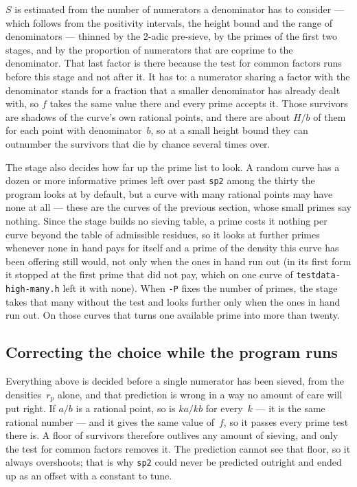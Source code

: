\documentclass[12pt,a4paper,oneside]{amsart}
\begin{document}
$S$ is estimated from the number of numerators a denominator has to consider
--- which follows from the positivity intervals, the height bound and the
range of denominators --- thinned by the 2-adic pre-sieve, by the
primes of the first two stages, and by the proportion of numerators that are
coprime to the denominator. That last factor is there because the test for
common factors runs before this stage and not after it. It has to: a
numerator sharing a factor with the denominator stands for a fraction that a
smaller denominator has already dealt with, so $f$ takes the same value there
and every prime accepts it. Those survivors are shadows of the curve's own
rational points, and there are about $H/b$ of them for each point with
denominator~$b$, so at a small height bound they can outnumber the survivors
that die by chance several times over.

The stage also decides how far up the prime list to look. A random curve has
a dozen or more informative primes left over past \texttt{sp2} among the
thirty the program looks at by default, but a curve with many rational points
may have none at all --- these are the curves of the previous section, whose
small primes say nothing. Since the stage builds no sieving table, a prime
costs it nothing per curve beyond the table of admissible residues, so it
looks at further primes whenever none in hand pays for itself and a prime
of the density this curve has been offering still would, not only when the
ones in hand run out (in its first form it stopped at the first prime that
did not pay, which on one curve of \texttt{testdata-high-many.h} left it
with none). When \verb+-P+ fixes the number of primes, the stage takes that
many without the test and looks further only when the ones in hand run out.
On those curves that turns one available prime into more than twenty.

\subsection{Correcting the choice while the program runs}\label{sec:adapt}

Everything above is decided before a single numerator has been sieved, from
the densities~$r_p$ alone, and that prediction is wrong in a way no amount of
care will put right. If $a/b$ is a rational point, so is $ka/kb$ for every~$k$
--- it is the same rational number --- and it gives the same value of~$f$,
so it passes every prime test there is. A floor of survivors therefore
outlives any amount of sieving, and only the test for common factors removes
it. The prediction cannot see that floor, so it always overshoots; that is
why \texttt{sp2} could never be predicted outright and ended up as an offset
with a constant to tune.
\end{document}
